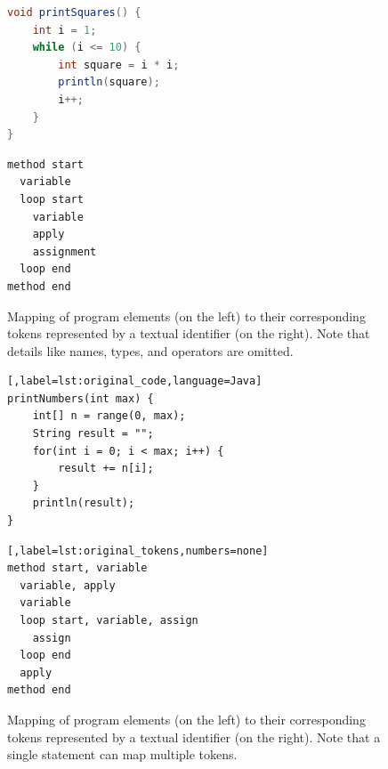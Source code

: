 \begin{figure}[h]
    \centering
    \begin{minipage}{0.45\textwidth}
        \begin{lstlisting}[label=lst:code,language=Java]
void printSquares() {
    int i = 1;
    while (i <= 10) {
        int square = i * i;
        println(square);
        i++;
    }
}
        \end{lstlisting}
    \end{minipage}
    \begin{minipage}{0.45\textwidth}
        \begin{lstlisting}[label=lst:tokens,numbers=none]
method start
  variable
  loop start
    variable
    apply
    assignment
  loop end
method end
        \end{lstlisting}
    \end{minipage}
    \caption[Mapping Program Elements to Tokens]{Mapping of program elements (on the left) to their corresponding tokens represented by a textual identifier (on the right). Note that details like names, types, and operators are omitted.}
    \label{fig:code_to_tokens}
\end{figure}

\begin{figure}[h]
    \centering
    \begin{minipage}{0.45\textwidth}
        \begin{lstlisting}[,label=lst:original_code,language=Java]
printNumbers(int max) {
    int[] n = range(0, max);
    String result = "";
    for(int i = 0; i < max; i++) {
        result += n[i];
    }
    println(result);
}
        \end{lstlisting}
    \end{minipage}
    \begin{minipage}{0.45\textwidth}
        \begin{lstlisting}[,label=lst:original_tokens,numbers=none]
method start, variable
  variable, apply
  variable
  loop start, variable, assign
    assign
  loop end
  apply
method end
        \end{lstlisting}
    \end{minipage}
    \caption[Mapping Program Elements to Tokens (Cont.)]{Mapping of program elements (on the left) to their corresponding tokens represented by a textual identifier (on the right). Note that a single statement can map multiple tokens.}
    \label{fig:code_to_tokens2}
\end{figure}

